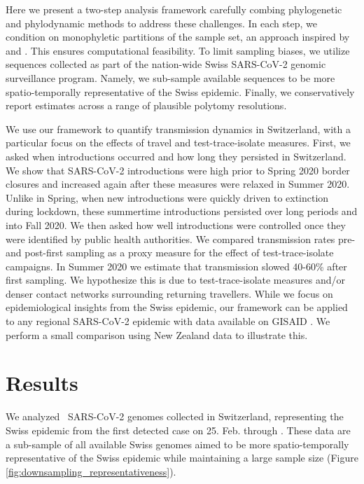 \documentclass[9pt,twoside,lineno]{pnas-new} %
\begin{document}
Here we present a two-step analysis framework carefully combing phylogenetic and phylodynamic methods to address these challenges. In each step, we condition on monophyletic partitions of the sample set, an approach inspired by  \cite{Muller2020} and \cite{DuPlessis}. This ensures computational feasibility. To limit sampling biases, we utilize sequences collected as part of the nation-wide Swiss SARS-CoV-2 genomic surveillance program. Namely, we sub-sample  available sequences to be more spatio-temporally representative of the Swiss epidemic. Finally, we conservatively report estimates across a range of plausible polytomy resolutions.

We use our framework to quantify transmission dynamics in Switzerland, with a particular focus on the effects of travel and test-trace-isolate measures. First, we asked when introductions occurred and how long they persisted in Switzerland. We show that SARS-CoV-2 introductions were high prior to Spring 2020 border closures and increased again after these measures were relaxed in Summer 2020. Unlike in Spring, when new introductions were quickly driven to extinction during lockdown, these summertime introductions persisted over long periods and into Fall 2020. We then asked how well introductions were controlled once they were identified by public health authorities. We compared transmission rates pre- and post-first sampling as a proxy measure for the effect of test-trace-isolate campaigns. In Summer 2020 we estimate that transmission slowed 40-60\% after first sampling. We hypothesize this is due to test-trace-isolate measures and/or denser contact networks surrounding returning travellers. While we focus on epidemiological insights from the Swiss epidemic, our framework can be applied to any regional SARS-CoV-2 epidemic with data available on GISAID \cite{GISAID}. We perform a small comparison using New Zealand data to illustrate this. 

\section{Results}
We analyzed \nfocalsamples\ SARS-CoV-2 genomes collected in Switzerland, representing the Swiss epidemic from the first detected case on 25. Feb. through \maxdate. These data are a sub-sample of all available Swiss genomes aimed to be more spatio-temporally representative of the Swiss epidemic while maintaining a large sample size (Figure  \ref{fig:downsampling_representativeness}). 
\end{document}
